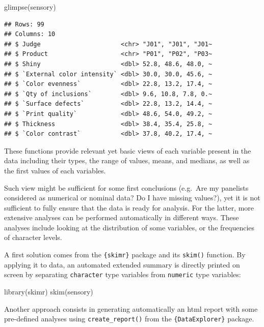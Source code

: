 \documentclass[
]{krantz}
\makeatletter
\newenvironment{Shaded}{\begin{snugshade}}{\end{snugshade}}
\newcommand{\FunctionTok}[1]{\textcolor[rgb]{0,0,0}{#1}}
\newcommand{\NormalTok}[1]{#1}
\newenvironment{kframe}{%
\medskip{}
\setlength{\fboxsep}{.8em}
 \def\at@end@of@kframe{}%
 \ifinner\ifhmode%
  \def\at@end@of@kframe{\end{minipage}}%
  \begin{minipage}{\columnwidth}%
 \fi\fi%
 \def\FrameCommand##1{\hskip\@totalleftmargin \hskip-\fboxsep
 \colorbox{shadecolor}{##1}\hskip-\fboxsep
     \hskip-\linewidth \hskip-\@totalleftmargin \hskip\columnwidth}%
 \MakeFramed {\advance\hsize-\width
   \@totalleftmargin\z@ \linewidth\hsize
   \@setminipage}}%
 {\par\unskip\endMakeFramed%
 \at@end@of@kframe}
\renewenvironment{Shaded}{\begin{kframe}}{\end{kframe}}
\makeatother
\begin{document}
\begin{Shaded}
\begin{Highlighting}[]
\FunctionTok{glimpse}\NormalTok{(sensory)}
\end{Highlighting}
\end{Shaded}

\begin{verbatim}
## Rows: 99
## Columns: 10
## $ Judge                      <chr> "J01", "J01", "J01~
## $ Product                    <chr> "P01", "P02", "P03~
## $ Shiny                      <dbl> 52.8, 48.6, 48.0, ~
## $ `External color intensity` <dbl> 30.0, 30.0, 45.6, ~
## $ `Color evenness`           <dbl> 22.8, 13.2, 17.4, ~
## $ `Qty of inclusions`        <dbl> 9.6, 10.8, 7.8, 0.~
## $ `Surface defects`          <dbl> 22.8, 13.2, 14.4, ~
## $ `Print quality`            <dbl> 48.6, 54.0, 49.2, ~
## $ Thickness                  <dbl> 38.4, 35.4, 25.8, ~
## $ `Color contrast`           <dbl> 37.8, 40.2, 17.4, ~
\end{verbatim}

These functions provide relevant yet basic views of each variable present in the data including their types, the range of values, means, and medians, as well as the first values of each variables.

Such view might be sufficient for some first conclusions (e.g.~Are my panelists considered as numerical or nominal data? Do I have missing values?), yet it is not sufficient to fully ensure that the data is ready for analysis. For the latter, more extensive analyses can be performed automatically in different ways. These analyses include looking at the distribution of some variables, or the frequencies of character levels.

A first solution comes from the \texttt{\{skimr\}} package and its \texttt{skim()} function. By applying it to data, an automated extended summary is directly printed on screen by separating \texttt{character} type variables from \texttt{numeric} type variables:

\begin{Shaded}
\begin{Highlighting}[]
\FunctionTok{library}\NormalTok{(skimr)}
\FunctionTok{skim}\NormalTok{(sensory)}
\end{Highlighting}
\end{Shaded}

Another approach consists in generating automatically an html report with some pre-defined analyses using \texttt{create\_report()} from the \texttt{\{DataExplorer\}} package.
\end{document}
